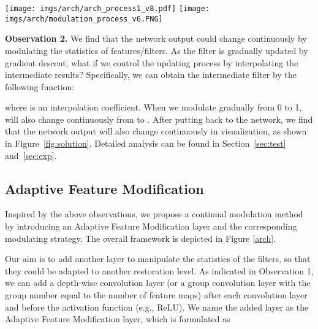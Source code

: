 \documentclass[10pt,twocolumn,letterpaper]{article}
\begin{document}
\begin{figure*}[t]
\centering
\vspace{-1em}
\texttt{[image: imgs/arch/arch\_process1\_v8.pdf]}
\texttt{[image: imgs/arch/modulation\_process\_v6.PNG]}
\vspace{-1em}
\caption{The left part presents the basic model and the AdaFM-Net. The right part shows how AdaFM works in the adaptation process and the modulation testing.}
\vspace{-1.5em}
\label{arch}
\end{figure*}

\textbf{Observation 2.} We find that the network output could change continuously by modulating the statistics of features/filters. As the filter  is gradually updated by gradient descent, what if we control the updating process by interpolating the intermediate results? 
Specifically, we can obtain the intermediate filter  by the following function:

\vspace{-0.5em}

where  is an interpolation coefficient. When we modulate  gradually from 0 to 1,  will also change continuously from  to . After putting  back to the network, we find that the network output will also change continuously in visualization, as shown in Figure~\ref{fig:solution}. Detailed analysis can be found in Section~\ref{sec:test} and~\ref{sec:exp}.


\subsection{Adaptive Feature Modification}
\label{sec:AdaFM}
Inspired by the above observations, we propose a continual modulation method by introducing an Adaptive Feature Modification layer and the corresponding modulating strategy. The overall framework is depicted in Figure \ref{arch}. 

Our aim is to add another layer to manipulate the statistics of the filters, so that they could be adapted to another restoration level. As indicated in Observation 1, we can add a depth-wise convolution layer (or a group convolution layer with the group number equal to the number of feature maps) after each convolution layer and before the activation function (e.g., ReLU). We name the added layer as the Adaptive Feature Modification layer, which is formulated as
\vspace{-0.5em}
\end{document}
